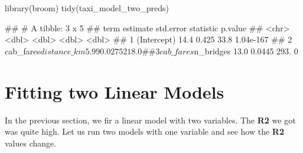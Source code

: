 \documentclass[
]{book}
\newenvironment{Shaded}{\begin{snugshade}}{\end{snugshade}}
\newcommand{\FunctionTok}[1]{\textcolor[rgb]{0.00,0.00,0.00}{#1}}
\newcommand{\NormalTok}[1]{#1}
\newcommand{\OtherTok}[1]{\textcolor[rgb]{0.56,0.35,0.01}{#1}}
\newcommand{\SpecialCharTok}[1]{\textcolor[rgb]{0.00,0.00,0.00}{#1}}
\begin{document}
\begin{Shaded}
\begin{Highlighting}[]
\FunctionTok{library}\NormalTok{(broom)}
\FunctionTok{tidy}\NormalTok{(taxi\_model\_two\_preds)}
\end{Highlighting}
\end{Shaded}

\begin{Shaded}
\begin{Highlighting}[]
\NormalTok{\#\# \# A tibble: 3 x 5}
\NormalTok{\#\#   term                  estimate std.error statistic   p.value}
\NormalTok{\#\#   \textless{}chr\textgreater{}                    \textless{}dbl\textgreater{}     \textless{}dbl\textgreater{}     \textless{}dbl\textgreater{}     \textless{}dbl\textgreater{}}
\NormalTok{\#\# 1 (Intercept)              14.4     0.425       33.8 1.04e{-}167}
\NormalTok{\#\# 2 cab\_fares$distance\_km     5.99    0.0275     218.  0        }
\NormalTok{\#\# 3 cab\_fares$n\_bridges      13.0     0.0445     293.  0}
\end{Highlighting}
\end{Shaded}

\hypertarget{fitting-two-linear-models}{%
\section{Fitting two Linear Models}\label{fitting-two-linear-models}}

In the previous section, we fir a linear model with two variables. The \textbf{R2} we got was quite high. Let us run two models with one variable and see how the \textbf{R2} values change.

\begin{Shaded}
\end{Shaded}

\begin{Shaded}
\end{Shaded}
\end{document}
